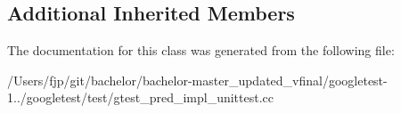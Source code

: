 \subsection*{Additional Inherited Members}


The documentation for this class was generated from the following file\+:\begin{DoxyCompactItemize}
\item 
/\+Users/fjp/git/bachelor/bachelor-\/master\+\_\+updated\+\_\+vfinal/googletest-\/1../googletest/test/gtest\+\_\+pred\+\_\+impl\+\_\+unittest.\+cc\end{DoxyCompactItemize}
